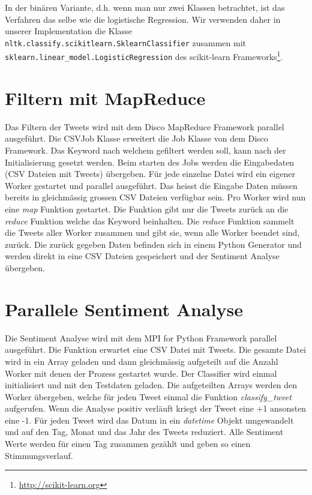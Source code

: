 \documentclass[12pt, oneside]{report}   	%
\begin{document}
In der binären Variante, d.h. wenn man nur zwei Klassen betrachtet, ist das Verfahren das selbe wie die logistische Regression. Wir verwenden daher in unserer Implementation die Klasse
\verb|nltk.classify.scikitlearn.SklearnClassifier| zusammen mit
\verb|sklearn.linear_model.LogisticRegression| des scikit-learn Frameworks\footnote{\url{http://scikit-learn.org}}.



\section{Filtern mit MapReduce}
Das Filtern der Tweets wird mit dem Disco MapReduce Framework parallel ausgeführt. Die CSVJob Klasse erweitert die Job Klasse von dem Disco Framework. Das Keyword nach welchem gefiltert werden soll, kann nach der Initialisierung gesetzt werden. Beim starten des Jobs werden die Eingabedaten (CSV Dateien mit Tweets) übergeben. Für jede einzelne Datei wird ein eigener Worker gestartet und parallel ausgeführt. Das heisst die Eingabe Daten müssen bereits in gleichmässig grossen CSV Dateien verfügbar sein. Pro Worker wird nun eine \emph{map} Funktion gestartet. Die Funktion gibt nur die Tweets zurück an die \emph{reduce} Funktion welche das Keyword beinhalten. Die \emph{reduce} Funktion sammelt die Tweets aller Worker zusammen und gibt sie, wenn alle Worker beendet sind, zurück. Die zurück gegeben Daten befinden sich in einem Python Generator und werden direkt in eine CSV Dateien gespeichert und der Sentiment Analyse übergeben.

\section{Parallele Sentiment Analyse}
Die Sentiment Analyse wird mit dem MPI for Python Framework parallel ausgeführt. Die Funktion erwartet eine CSV Datei mit Tweets. Die gesamte Datei wird in ein Array geladen und dann gleichmässig aufgeteilt auf die Anzahl Worker mit denen der Prozess gestartet wurde. Der Classifier wird einmal initialisiert und mit den Testdaten geladen. Die aufgeteilten Arrays werden den Worker übergeben, welche für jeden Tweet einmal die Funktion \emph{classify\_tweet} aufgerufen. Wenn die Analyse positiv verläuft kriegt der Tweet eine +1 ansonsten eine -1. \newline{} 
%
Für jeden Tweet wird das Datum in ein \emph{datetime} Objekt umgewandelt und auf den Tag, Monat und das Jahr des Tweets reduziert. Alle Sentiment Werte werden für einen Tag zusammen gezählt und geben so einen Stimmungsverlauf.
\end{document}
